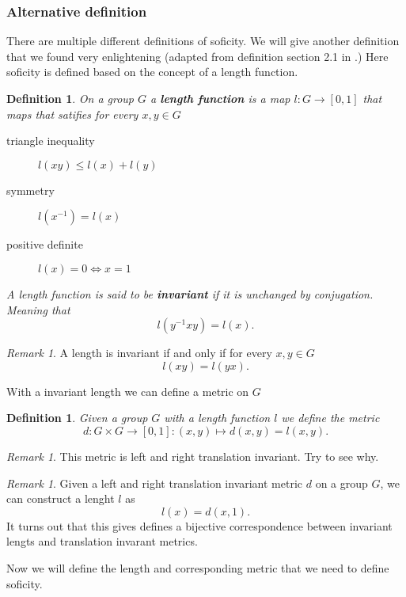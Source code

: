 \documentclass[titlepage, a4paper]{article}
\newtheorem{definition}[theorem]{Definition}
\theoremstyle{remark}
\newtheorem{remark}[theorem]{Remark}
\begin{document}
	\subsubsection{Alternative definition}
	There are multiple different definitions of soficity. 
	We will give another definition that we found very enlightening (adapted from definition section 2.1 in \cite{capraro_lupini_2015}.)
	Here soficity is defined based on the concept of a length function.
	\begin{definition}
		On a group $G$ a \textbf{length function} is a map $l: G \to [0,1]$ that maps that satifies for every  $x, y \in G$
		\begin{description}
			\item[triangle inequality] $l(xy) \le l(x) + l(y)$
			\item[symmetry]  $l(x^{-1}) = l(x)$
			\item[positive definite] $l(x) = 0 \iff x =1$
		\end{description}
		A length function is said to be \textbf{invariant} if it is unchanged by conjugation. Meaning that \[
			l(y^{-1}xy) = l(x)
		.\] 
	\end{definition}
	\begin{remark}
		A length is invariant if and only if for every $x, y \in G$ \[
			l(xy) = l(yx)
		.\] 
	\end{remark}
	
	With a invariant length we can define a metric on $G$
	 \begin{definition}
	 Given a group $G$ with a length function $l$ we define the metric \[d: G\times G \to [0,1]: (x,y) \mapsto d(x,y) = l(x,y). \]
	\end{definition}
	\begin{remark}
		This metric is left and right translation invariant. Try to see why.
	\end{remark}
	\begin{remark}
		Given a left and right translation invariant metric $d$ on a group  $G$, we can construct a lenght  $l$ as  \[
			l(x) = d(x, 1)
		.\] 
		It turns out that this gives defines a bijective correspondence between invariant lengts and translation invarant metrics. 
	\end{remark}
	
	Now we will define the length and corresponding metric that we need to define soficity.
\end{document}
